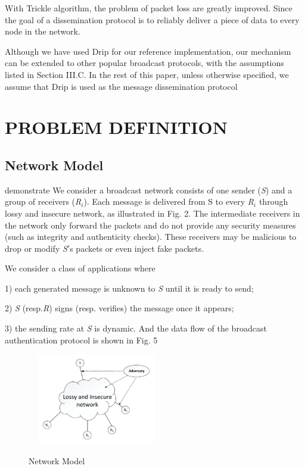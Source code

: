 \documentclass{sig-alternate-05-2015}
\begin{document}
With Trickle algorithm, the problem of packet loss are greatly improved. Since the goal of a dissemination protocol is to reliably deliver a piece of data to every node in the network.
	
	Although we have used Drip for our reference implementation, our mechanism can be extended to other popular broadcast protocols, with the assumptions listed in Section III.C. In the rest of this paper, unless otherwise specified, we assume that Drip is used as the message dissemination protocol

\section{ PROBLEM DEFINITION}
\subsection{Network Model}
	demonstrate 
	We consider a broadcast network consists of one sender (\emph{S}) and a group of receivers (\emph{R$_i$}). Each message is delivered from S to every \emph{R$_i$} through lossy and insecure network, as illustrated in Fig. 2. The intermediate receivers in the network only forward the packets and do not provide any security measures (such as integrity and authenticity checks). These receivers may be malicious to drop or modify \emph{S}$'$s packets or even inject fake packets.
	
	We consider a class of applications where
	
	1) each generated message is unknown to \emph{S} until it is ready to send; 
	
	2) \emph{S} (resp.\emph{R}) signs (resp. verifies) the message once it appears; 
	
	3) the sending rate at \emph{S} is dynamic. And the data flow of the broadcast authentication protocol is shown in Fig. 5
	
	
\begin{figure}
\centering
\includegraphics[width=6cm,height=4cm]{NetworkModel.pdf}\\
\caption{Network Model}\label{} 
\end{figure}
\end{document}

